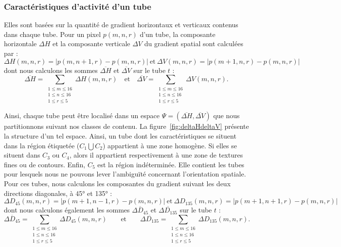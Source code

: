 \subsubsection{Caractéristiques d'activité d'un tube}
Elles sont basées sur la quantité de gradient horizontaux et verticaux contenus dans chaque tube. Pour un pixel $p(m,n,r)$ d'un tube, la composante horizontale $\Delta H$ et la composante verticale $\Delta V$ du gradient spatial sont calculées par :
\begin{equation}
\Delta H(m,n,r) = | p(m, n+1,r) - p(m,n,r)| \ \text{et}\ \Delta V(m,n,r) = | p(m+1, n,r) - p(m,n,r)|
\end{equation}
%
dont nous calculons les sommes $\overline{\Delta H}$ et $\overline{\Delta V}$ sur le tube $t$ :
%
\begin{equation}
\overline{\Delta H} = \sum_{\substack{1\le m\le 16 \\ 1\le n\le 16 \\ 1\le r \le 5}} \Delta H(m,n,r) \quad \text{et}\quad \overline{\Delta V} = \sum_{\substack{1\le m\le 16 \\ 1\le n\le 16 \\ 1\le r \le 5}} \Delta V(m,n,r).
\end{equation}

Ainsi, chaque tube peut être localisé dans un espace $\Psi=(\overline{\Delta H}, \overline{\Delta V})$ que nous partitionnons suivant nos classes de contenu. La figure~\ref{fig:deltaHdeltaV} présente la structure d'un tel espace. Ainsi, un tube dont les caractéristiques se situent dans la région étiquetée ($C_1\bigcup C_2$) appartient à une zone homogène. Si elles se situent dans $C_3$ ou $C_4$, alors il appartient respectivement à une zone de textures fines ou de contours. Enfin, $C_5$ est la région indéterminée. Elle contient les tubes pour lesquels nous ne pouvons lever l'ambiguïté concernant l'orientation spatiale. Pour ces tubes, nous calculons les composantes du gradient suivant les deux directions diagonales, à 45° et 135°  :
\begin{equation}
\Delta D_{45}(m,n,r) = | p(m+1, n-1,r) - p(m,n,r)| \ \text{et}\ \Delta D_{135}(m,n,r) = | p(m+1, n+1,r) - p(m,n,r)|
\end{equation}
%
dont nous calculons également les sommes $\overline{\Delta D_{45}}$ et $\overline{\Delta D_{135}}$ sur le tube $t$ :
\begin{equation}
\overline{\Delta D_{45}} = \sum_{\substack{1\le m\le 16 \\ 1\le n\le 16 \\ 1\le r \le 5}} \Delta D_{45}(m,n,r) \qquad \text{et}\qquad \overline{\Delta D_{135}} = \sum_{\substack{1\le m\le 16 \\ 1\le n\le 16 \\ 1\le r \le 5}} \Delta D_{135}(m,n,r).
\end{equation}

